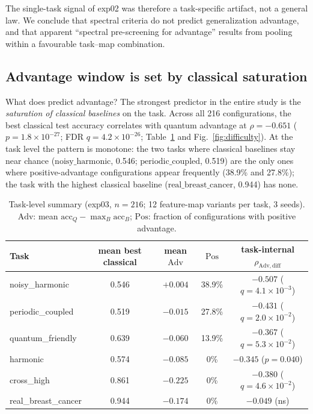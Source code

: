 \documentclass[aps,pra,preprint]{revtex4-2}
\begin{document}
The single-task signal of exp02 was therefore a task-specific artifact, not a general
law. We conclude that spectral criteria do not predict generalization advantage, and
that apparent ``spectral pre-screening for advantage'' results from pooling within a
favourable task--map combination.

\subsection{Advantage window is set by classical saturation}
\label{sec:difficulty}

What does predict advantage? The strongest predictor in the entire study is the
\emph{saturation of classical baselines} on the task. Across all 216 configurations,
the best classical test accuracy correlates with quantum advantage at $\rho=-0.651$
($p=1.8\times10^{-27}$; FDR $q=4.2\times10^{-26}$; Table~\ref{tab:difficulty} and
Fig.~\ref{fig:difficulty}). At the task level the pattern is monotone: the two tasks
where classical baselines stay near chance ($\mathrm{noisy\_harmonic}$, 0.546;
$\mathrm{periodic\_coupled}$, 0.519) are the only ones where positive-advantage
configurations appear frequently (38.9\% and 27.8\%); the task with the highest classical
baseline ($\mathrm{real\_breast\_cancer}$, 0.944) has none.

\begin{table}[t]
\centering
\caption{Task-level summary (exp03, $n=216$; 12 feature-map variants per task, 3 seeds).
$\mathrm{Adv}$: mean $\mathrm{acc}_Q-\max_B\mathrm{acc}_B$; $\mathrm{Pos}$: fraction of
configurations with positive advantage.}
\label{tab:difficulty}
\small
\begin{tabular}{lcccc}
\toprule
Task & mean best classical & mean $\mathrm{Adv}$ & $\mathrm{Pos}$ & task-internal $\rho_{\mathrm{Adv,diff}}$ \\
\midrule
noisy\_harmonic & 0.546 & $+0.004$ & 38.9\% & $-0.507$ ($q=4.1\times10^{-3}$) \\
periodic\_coupled & 0.519 & $-0.015$ & 27.8\% & $-0.431$ ($q=2.0\times10^{-2}$) \\
quantum\_friendly & 0.639 & $-0.060$ & 13.9\% & $-0.367$ ($q=5.3\times10^{-2}$) \\
harmonic & 0.574 & $-0.085$ & 0\% & $-0.345$ ($p=0.040$) \\
cross\_high & 0.861 & $-0.225$ & 0\% & $-0.380$ ($q=4.6\times10^{-2}$) \\
real\_breast\_cancer & 0.944 & $-0.174$ & 0\% & $-0.049$ (ns) \\
\bottomrule
\end{tabular}
\end{table}
\end{document}
